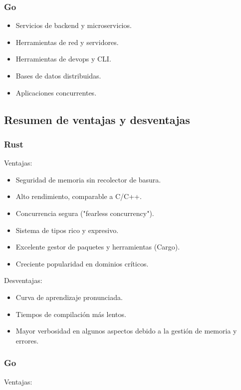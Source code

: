 \subsubsection{Go}

\begin{itemize}
    \item Servicios de backend y microservicios.
    \item Herramientas de red y servidores.
    \item Herramientas de \gls{devops} y CLI.
    \item Bases de datos distribuidas.
    \item Aplicaciones concurrentes.
\end{itemize}

\subsection{Resumen de ventajas y desventajas}

\subsubsection{Rust}
Ventajas:
\begin{itemize}
    \item Seguridad de memoria sin recolector de basura.
    \item Alto rendimiento, comparable a C/C++.
    \item Concurrencia segura ("fearless concurrency").
    \item Sistema de tipos rico y expresivo.
    \item Excelente gestor de paquetes y herramientas (Cargo).
    \item Creciente popularidad en dominios críticos.
\end{itemize}
Desventajas:
\begin{itemize}
    \item Curva de aprendizaje pronunciada.
    \item Tiempos de compilación más lentos.
    \item Mayor verbosidad en algunos aspectos debido a la gestión de memoria y errores.
\end{itemize}

\subsubsection{Go}
Ventajas:

